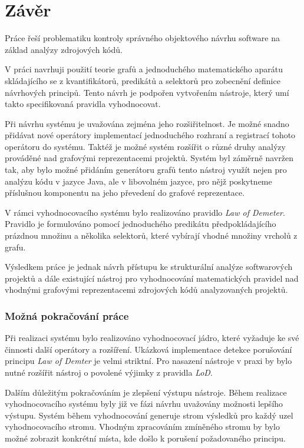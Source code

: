 \chapter{Závěr}

Práce řeší problematiku kontroly správného objektového návrhu software na základ analýzy zdrojových kódů.

V práci navrhuji použití teorie grafů a jednoduchého matematického aparátu skládajícího se z kvantifikátorů, predikátů a selektorů pro zobecnění definice návrhových principů. Tento návrh je podpořen vytvořením nástroje, který umí takto specifikovaná pravidla vyhodnocovat.

Při návrhu systému je uvažována zejména jeho rozšiřitelnost. Je možné snadno přidávat nové operátory implementací jednoduchého rozhraní a registrací tohoto operátoru do systému. Taktéž je možné systém rozšířit o různé druhy analýzy prováděné nad grafovými reprezentacemi projektů. Systém byl záměrně navržen tak, aby bylo možné přidáním generátoru grafů tento nástroj využít nejen pro analýzu kódu v jazyce Java, ale v libovolném jazyce, pro nějž poskytneme příslušnou komponentu na jeho převedení do grafové reprezentace.

V rámci vyhodnocovacího systému bylo realizováno pravidlo \emph{Law of Demeter}. Pravidlo je formulováno pomocí jednoduchého predikátu předpokládajícího prázdnou množinu a několika selektorů, které vybírají vhodné množiny vrcholů z grafu.

Výsledkem práce je jednak návrh přístupu ke strukturální analýze softwarových projektů a dále existující nástroj pro vyhodnocování matematických pravidel nad vhodnými grafovými reprezentacemi zdrojových kódů analyzovaných projektů.

\subsection*{Možná pokračování práce}
Při realizaci systému bylo realizováno vyhodnocovací jádro, které vyžaduje ke své činnosti další operátory a rozšíření. Ukázková implementace detekce porušování principu \emph{Law of Demter} je velmi striktní. Pro nasazení nástroje v praxi by bylo nutné rozšířit nástroj o povolené výjimky z pravidla \emph{LoD}.

Dalším důležitým pokračováním je zlepšení výstupu nástroje. Během realizace vyhodnocovacího systému byly již ve fázi návrhu uvažovány možnosti lepšího výstupu. Systém během vyhodnocování generuje strom výsledků pro každý uzel vyhodnocovacího stromu. Vhodným zpracováním zmíněného stromu by bylo možné zobrazit konkrétní místa, kde došlo k porušení požadovaného principu.
